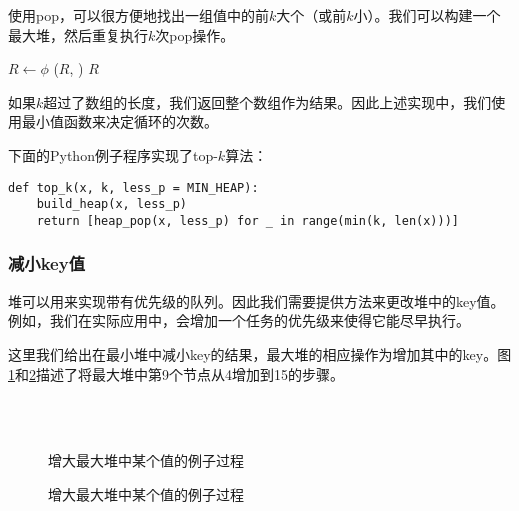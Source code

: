 \documentclass[UTF8]{article}
\begin{document}
使用pop，可以很方便地找出一组值中的前$k$大个（或前$k$小）。我们可以构建一个最大堆，然后重复执行$k$次pop操作。

\begin{algorithmic}[1]
  \State $R \gets \phi$
  \State {}
    \State {}($R$, )
  \EndFor
  \State \Return $R$
\EndFunction
\end{algorithmic}

如果$k$超过了数组的长度，我们返回整个数组作为结果。因此上述实现中，我们使用最小值函数来决定循环的次数。

下面的Python例子程序实现了top-$k$算法：

\lstset{language=Python}
\begin{lstlisting}
def top_k(x, k, less_p = MIN_HEAP):
    build_heap(x, less_p)
    return [heap_pop(x, less_p) for _ in range(min(k, len(x)))]
\end{lstlisting}

\subsubsection{减小key值}

堆可以用来实现带有优先级的队列。因此我们需要提供方法来更改堆中的key值。例如，我们在实际应用中，会增加一个任务的优先级来使得它能尽早执行。

这里我们给出在最小堆中减小key的结果，最大堆的相应操作为增加其中的key。图\ref{fig:decrease-key-1}和\ref{fig:decrease-key-2}描述了将最大堆中第9个节点从4增加到15的步骤。

\begin{figure}[htbp]
    \centering
     \\
     \\
    \caption{增大最大堆中某个值的例子过程} \label{fig:decrease-key-1}
\end{figure}

\begin{figure}[htbp]
    \centering
    \caption{增大最大堆中某个值的例子过程} \label{fig:decrease-key-2}
\end{figure}
\end{document}
